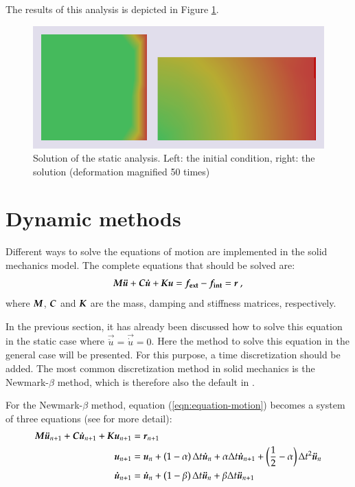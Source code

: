 The results of this analysis is depicted in Figure
\ref{fig:smm:implicit:static_solution}.

\begin{figure}[!htb] \centering
  \includegraphics[width=.6\linewidth]{figures/static_analysis}
  \caption{Solution of the static analysis. Left: the initial
condition, right: the solution (deformation magnified 50 times)}
  \label{fig:smm:implicit:static_solution}
\end{figure}

\section{Dynamic methods} \label{sect:smm:Dynamic_methods}

Different ways to solve the equations of motion are implemented in the
solid mechanics model.  The complete equations that should be solved
are:
\begin{equation}\label{eqn:equation-motion} \boldsymbol{M}\boldsymbol{\ddot{u}} +
\boldsymbol{C}\boldsymbol{\dot{u}} + \boldsymbol{K}\boldsymbol{u} = \boldsymbol{f_{{\mathrm{ext}}}} -
\boldsymbol{f_{{\mathrm{int}}}} = \boldsymbol{r}~,
\end{equation} where $\boldsymbol{M}$, $\boldsymbol{C}$ and $\boldsymbol{K}$ are the mass,
damping and stiffness matrices, respectively.

In the previous section, it has already been discussed how to solve
this equation in the static case where $\vec{\ddot{u}} = \vec{\dot{u}}
= 0$.  Here the method to solve this equation in the general case will
be presented.  For this purpose, a time discretization should be
added.  The most common discretization method in solid mechanics is
the Newmark-$\beta$ method, which is therefore also the default in
\akantu.

For the Newmark-$\beta$ method, equation (\ref{eqn:equation-motion})
becomes a system of three equations (see \cite{curnier92a}
\cite{hughes-83a} for more detail):
\begin{align} \boldsymbol{M} \boldsymbol{\ddot{u}}_{n+1} + \boldsymbol{C}
\boldsymbol{\dot{u}}_{n+1} + \boldsymbol{K} \boldsymbol{u}_{n+1} &=
\boldsymbol{r}_{n+1} \label{eqn:equation-motion-discret} \\ \boldsymbol{u}_{n+1} &=
\boldsymbol{u}_{n} + \left(1 - \alpha\right) \Delta t \boldsymbol{\dot{u}}_{n} +
\alpha \Delta t \boldsymbol{\dot{u}}_{n+1} + \left(\frac{1}{2} -
\alpha\right) \Delta t^2
\boldsymbol{\ddot{u}}_{n} \label{eqn:finite-difference-1}\\
\boldsymbol{\dot{u}}_{n+1} &= \boldsymbol{\dot{u}}_{n} + \left(1 - \beta\right)
\Delta t \boldsymbol{\ddot{u}}_{n} + \beta \Delta t
\boldsymbol{\ddot{u}}_{n+1} \label{eqn:finite-difference-2}
\end{align}

